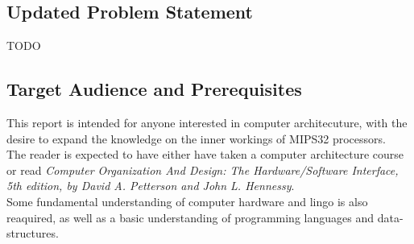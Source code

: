 
\subsection*{Updated Problem Statement}
TODO

\subsection*{Target Audience and Prerequisites}
This report is intended for anyone interested in computer architecuture, with
the desire to expand the knowledge on the inner workings of MIPS32 processors.\\
The reader is expected to have either have taken a computer architecture course
or read \textit{Computer Organization And Design: The Hardware/Software Interface, 5th
edition, by David A. Petterson and John L. Hennessy}.\\
Some fundamental understanding of computer hardware and lingo is also reaquired,
as well as a basic understanding of programming languages and data-structures.
